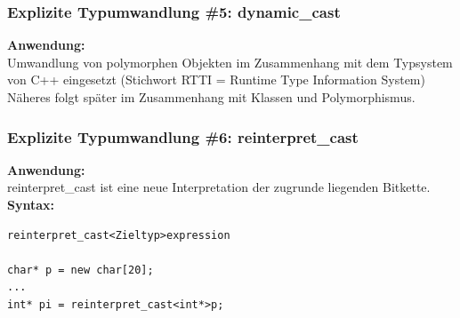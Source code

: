 \subsubsection{Explizite Typumwandlung \#5: dynamic\_cast}
\label{esc:Explizite Typumwandlung 5}
\textbf{Anwendung:}\\
Umwandlung von polymorphen Objekten im Zusammenhang mit dem Typsystem von C++ eingesetzt (Stichwort RTTI = Runtime Type Information System)\\
Näheres folgt später im Zusammenhang mit Klassen und Polymorphismus.

\subsubsection{Explizite Typumwandlung \#6: reinterpret\_cast}
\label{sec:Explizite Typumwandlung 6}
\textbf{Anwendung:}\\
reinterpret\_cast ist eine neue Interpretation der zugrunde liegenden Bitkette.\\
\textbf{Syntax:}
\noindent
\begin{minipage}{\linewidth}
\begin{lstlisting}
reinterpret_cast<Zieltyp>expression

char* p = new char[20];
...
int* pi = reinterpret_cast<int*>p;
\end{lstlisting}
\end{minipage}


